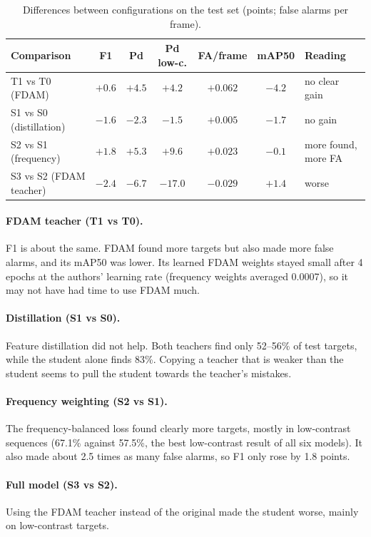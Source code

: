 \documentclass[11pt,a4paper]{article}
\begin{document}
\begin{table}[htbp]
\centering
\caption{Differences between configurations on the test set (points; false alarms per frame).}
\label{tab:ablations}
\small
\begin{tabular}{lcccccl}
\toprule
Comparison & F1 & Pd & Pd low-c. & FA/frame & mAP50 & Reading \\
\midrule
T1 vs T0 (FDAM) & $+0.6$ & $+4.5$ & $+4.2$ & $+0.062$ & $-4.2$ & no clear gain \\
S1 vs S0 (distillation) & $-1.6$ & $-2.3$ & $-1.5$ & $+0.005$ & $-1.7$ & no gain \\
S2 vs S1 (frequency) & $+1.8$ & $+5.3$ & $+9.6$ & $+0.023$ & $-0.1$ & more found, more FA \\
S3 vs S2 (FDAM teacher) & $-2.4$ & $-6.7$ & $-17.0$ & $-0.029$ & $+1.4$ & worse \\
\bottomrule
\end{tabular}
\end{table}

\paragraph{FDAM teacher (T1 vs T0).} F1 is about the same. FDAM found more targets but also made more false
alarms, and its mAP50 was lower. Its learned FDAM weights stayed small after 4 epochs at the authors' learning
rate (frequency weights averaged 0.0007), so it may not have had time to use FDAM much.

\paragraph{Distillation (S1 vs S0).} Feature distillation did not help. Both teachers find only 52--56\% of test
targets, while the student alone finds 83\%. Copying a teacher that is weaker than the student seems to pull the
student towards the teacher's mistakes.

\paragraph{Frequency weighting (S2 vs S1).} The frequency-balanced loss found clearly more targets, mostly in
low-contrast sequences (67.1\% against 57.5\%, the best low-contrast result of all six models). It also made about
2.5 times as many false alarms, so F1 only rose by 1.8 points.

\paragraph{Full model (S3 vs S2).} Using the FDAM teacher instead of the original made the student worse, mainly
on low-contrast targets.
\end{document}
